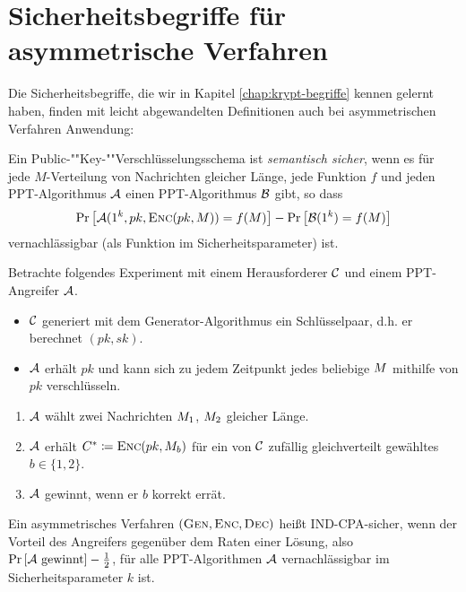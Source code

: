 \section{Sicherheitsbegriffe für asymmetrische Verfahren} Die
Sicherheitsbegriffe, die wir in Kapitel \ref{chap:krypt-begriffe} kennen
gelernt haben, finden mit leicht abgewandelten Definitionen auch bei
asymmetrischen Verfahren Anwendung:

\begin{definition} Ein
  Pub\-lic-""Key-""Ver\-schlüs\-sel\-ungs\-sche\-ma ist \textit{semantisch
    sicher}, wenn es für jede $M$-Verteilung von Nachrichten gleicher Länge,
  jede Funktion $f$ und jeden PPT-Algorithmus $\mathcal{A}$ einen PPT-Algorithmus
  $\mathcal{B}$ gibt, so dass
  \begin{equation*} \Pr\left[\mathcal{A}(1^k, pk, \textsc{Enc}(pk, M)) = f(M)\right] -
    \Pr\left[\mathcal{B}(1^k) = f(M)\right]
  \end{equation*} vernachlässigbar (als Funktion im Sicherheitsparameter)
  ist.
\end{definition}

\begin{definition}\indexINDCPA Betrachte folgendes Experiment mit
  einem Herausforderer $\mathcal{C}$ und einem PPT-Angreifer $\mathcal{A}$.
  \begin{itemize}
  \item $\mathcal{C}$ generiert mit dem Generator-Algorithmus ein Schlüsselpaar,
    d.h. er berechnet $(pk, sk)$.
  \item $\mathcal{A}$ erhält $pk$ und kann sich zu jedem Zeitpunkt jedes
    beliebige $M$ mithilfe von $pk$ verschlüsseln.
  \end{itemize}
  \begin{enumerate}
  \item $\mathcal{A}$ wählt zwei Nachrichten $M_1$, $M_2$ gleicher
    Länge.
  \item $\mathcal{A}$ erhält $C^{*} \coloneqq \textsc{Enc}(pk, M_{b})$ für ein von
    $\mathcal{C}$ zufällig gleichverteilt gewähltes $b \in \{1, 2\}$.
  \item $\mathcal{A}$ gewinnt, wenn er $b$ korrekt errät.
  \end{enumerate} Ein asymmetrisches Verfahren $(\textsc{Gen}, \textsc{Enc}, \textsc{Dec})$
  heißt IND-CPA-sicher, wenn der Vorteil des Angreifers gegenüber dem
  Raten einer Lösung, also $\Pr \left[ \mathcal{A} \textnormal{ gewinnt} \right] -
  \frac{1}{2}$, für alle PPT-Algorithmen $\mathcal{A}$ vernachlässigbar im
  Sicherheitsparameter $k$ ist.
\end{definition}

